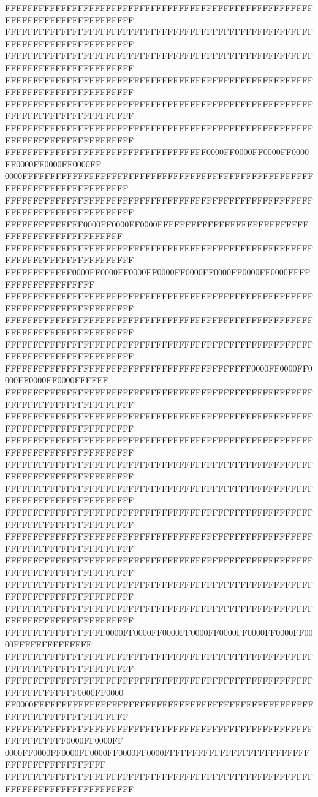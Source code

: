 FFFFFFFFFFFFFFFFFFFFFFFFFFFFFFFFFFFFFFFFFFFFFFFFFFFFFFFFFFFFFFFFFFFFFFFFFFFFFF
FFFFFFFFFFFFFFFFFFFFFFFFFFFFFFFFFFFFFFFFFFFFFFFFFFFFFFFFFFFFFFFFFFFFFFFFFFFFFF
FFFFFFFFFFFFFFFFFFFFFFFFFFFFFFFFFFFFFFFFFFFFFFFFFFFFFFFFFFFFFFFFFFFFFFFFFFFFFF
FFFFFFFFFFFFFFFFFFFFFFFFFFFFFFFFFFFFFFFFFFFFFFFFFFFFFFFFFFFFFFFFFFFFFFFFFFFFFF
FFFFFFFFFFFFFFFFFFFFFFFFFFFFFFFFFFFFFFFFFFFFFFFFFFFFFFFFFFFFFFFFFFFFFFFFFFFFFF
FFFFFFFFFFFFFFFFFFFFFFFFFFFFFFFFFFFFFFFFFFFFFFFFFFFFFFFFFFFFFFFFFFFFFFFFFFFFFF
FFFFFFFFFFFFFFFFFFFFFFFFFFFFFFFFFFFF0000FF0000FF0000FF0000FF0000FF0000FF0000FF
0000FFFFFFFFFFFFFFFFFFFFFFFFFFFFFFFFFFFFFFFFFFFFFFFFFFFFFFFFFFFFFFFFFFFFFFFFFF
FFFFFFFFFFFFFFFFFFFFFFFFFFFFFFFFFFFFFFFFFFFFFFFFFFFFFFFFFFFFFFFFFFFFFFFFFFFFFF
FFFFFFFFFFFFFF0000FF0000FF0000FFFFFFFFFFFFFFFFFFFFFFFFFFFFFFFFFFFFFFFFFFFFFFFF
FFFFFFFFFFFFFFFFFFFFFFFFFFFFFFFFFFFFFFFFFFFFFFFFFFFFFFFFFFFFFFFFFFFFFFFFFFFFFF
FFFFFFFFFFFF0000FF0000FF0000FF0000FF0000FF0000FF0000FF0000FFFFFFFFFFFFFFFFFFFF
FFFFFFFFFFFFFFFFFFFFFFFFFFFFFFFFFFFFFFFFFFFFFFFFFFFFFFFFFFFFFFFFFFFFFFFFFFFFFF
FFFFFFFFFFFFFFFFFFFFFFFFFFFFFFFFFFFFFFFFFFFFFFFFFFFFFFFFFFFFFFFFFFFFFFFFFFFFFF
FFFFFFFFFFFFFFFFFFFFFFFFFFFFFFFFFFFFFFFFFFFFFFFFFFFFFFFFFFFFFFFFFFFFFFFFFFFFFF
FFFFFFFFFFFFFFFFFFFFFFFFFFFFFFFFFFFFFFFFFFFF0000FF0000FF0000FF0000FF0000FFFFFF
FFFFFFFFFFFFFFFFFFFFFFFFFFFFFFFFFFFFFFFFFFFFFFFFFFFFFFFFFFFFFFFFFFFFFFFFFFFFFF
FFFFFFFFFFFFFFFFFFFFFFFFFFFFFFFFFFFFFFFFFFFFFFFFFFFFFFFFFFFFFFFFFFFFFFFFFFFFFF
FFFFFFFFFFFFFFFFFFFFFFFFFFFFFFFFFFFFFFFFFFFFFFFFFFFFFFFFFFFFFFFFFFFFFFFFFFFFFF
FFFFFFFFFFFFFFFFFFFFFFFFFFFFFFFFFFFFFFFFFFFFFFFFFFFFFFFFFFFFFFFFFFFFFFFFFFFFFF
FFFFFFFFFFFFFFFFFFFFFFFFFFFFFFFFFFFFFFFFFFFFFFFFFFFFFFFFFFFFFFFFFFFFFFFFFFFFFF
FFFFFFFFFFFFFFFFFFFFFFFFFFFFFFFFFFFFFFFFFFFFFFFFFFFFFFFFFFFFFFFFFFFFFFFFFFFFFF
FFFFFFFFFFFFFFFFFFFFFFFFFFFFFFFFFFFFFFFFFFFFFFFFFFFFFFFFFFFFFFFFFFFFFFFFFFFFFF
FFFFFFFFFFFFFFFFFFFFFFFFFFFFFFFFFFFFFFFFFFFFFFFFFFFFFFFFFFFFFFFFFFFFFFFFFFFFFF
FFFFFFFFFFFFFFFFFFFFFFFFFFFFFFFFFFFFFFFFFFFFFFFFFFFFFFFFFFFFFFFFFFFFFFFFFFFFFF
FFFFFFFFFFFFFFFFFFFFFFFFFFFFFFFFFFFFFFFFFFFFFFFFFFFFFFFFFFFFFFFFFFFFFFFFFFFFFF
FFFFFFFFFFFFFFFFFF0000FF0000FF0000FF0000FF0000FF0000FF0000FF0000FFFFFFFFFFFFFF
FFFFFFFFFFFFFFFFFFFFFFFFFFFFFFFFFFFFFFFFFFFFFFFFFFFFFFFFFFFFFFFFFFFFFFFFFFFFFF
FFFFFFFFFFFFFFFFFFFFFFFFFFFFFFFFFFFFFFFFFFFFFFFFFFFFFFFFFFFFFFFFFFFF0000FF0000
FF0000FFFFFFFFFFFFFFFFFFFFFFFFFFFFFFFFFFFFFFFFFFFFFFFFFFFFFFFFFFFFFFFFFFFFFFFF
FFFFFFFFFFFFFFFFFFFFFFFFFFFFFFFFFFFFFFFFFFFFFFFFFFFFFFFFFFFFFFFFFF0000FF0000FF
0000FF0000FF0000FF0000FF0000FF0000FFFFFFFFFFFFFFFFFFFFFFFFFFFFFFFFFFFFFFFFFFFF
FFFFFFFFFFFFFFFFFFFFFFFFFFFFFFFFFFFFFFFFFFFFFFFFFFFFFFFFFFFFFFFFFFFFFFFFFFFFFF
